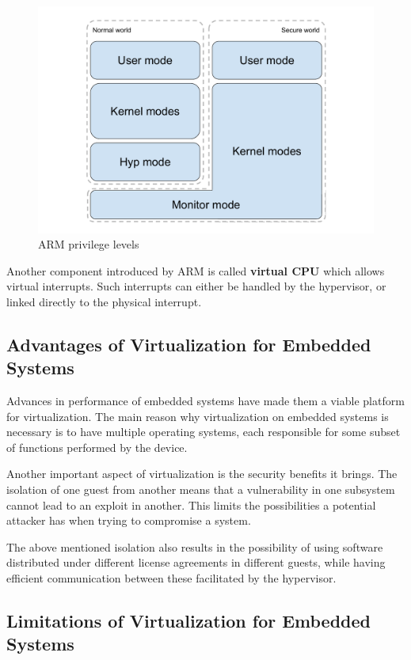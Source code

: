 \begin{figure}[h!]
\centering
  \includegraphics[width=.7\linewidth]{img/arm.pdf}
  \caption{ARM privilege levels}
\end{figure}

Another component introduced by ARM is called \textbf{virtual CPU} which allows virtual interrupts. Such interrupts can either be handled by the hypervisor, or linked directly to the physical interrupt\cite{hw-support-arm}.

\subsection{Advantages of Virtualization for Embedded Systems}
\label{subsec:advvirt}

Advances in performance of embedded systems have made them a viable platform for virtualization. The main reason why virtualization on embedded systems is necessary is to have multiple operating systems, each responsible for some subset of functions performed by the device.

Another important aspect of virtualization is the security benefits it brings. The isolation of one guest from another means that a vulnerability in one subsystem cannot lead to an exploit in another. This limits the possibilities a potential attacker has when trying to compromise a system\cite{virt-embedded}.

The above mentioned isolation also results in the possibility of using software distributed under different license agreements in different guests, while having efficient communication between these facilitated by the hypervisor.

\subsection{Limitations of Virtualization for Embedded Systems}
\label{subsec:limitvirt}


